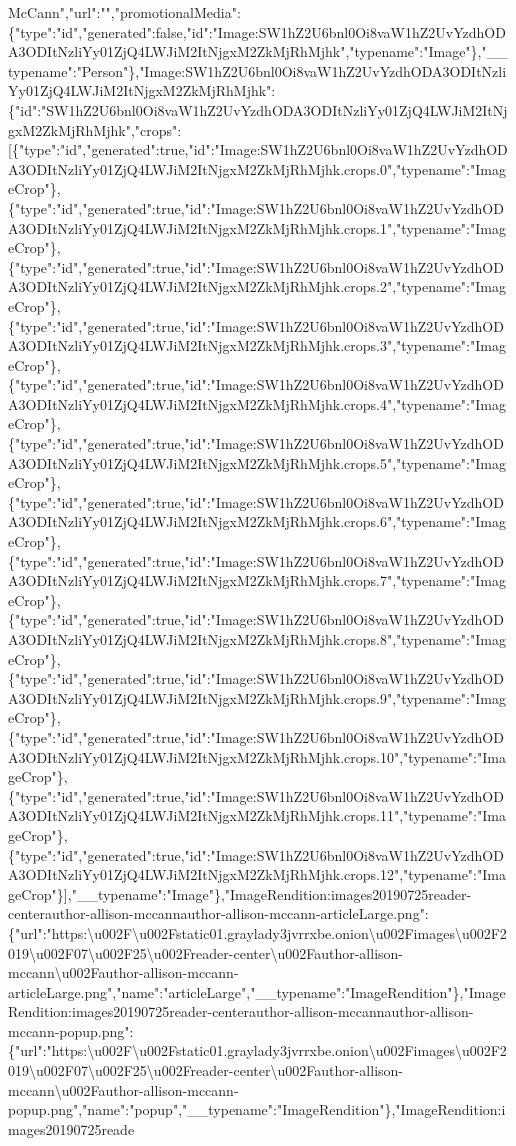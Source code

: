 McCann","url":"","promotionalMedia":\{"type":"id","generated":false,"id":"Image:SW1hZ2U6bnl0Oi8vaW1hZ2UvYzdhODA3ODItNzliYy01ZjQ4LWJiM2ItNjgxM2ZkMjRhMjhk","typename":"Image"\},"\_\_typename":"Person"\},"Image:SW1hZ2U6bnl0Oi8vaW1hZ2UvYzdhODA3ODItNzliYy01ZjQ4LWJiM2ItNjgxM2ZkMjRhMjhk":\{"id":"SW1hZ2U6bnl0Oi8vaW1hZ2UvYzdhODA3ODItNzliYy01ZjQ4LWJiM2ItNjgxM2ZkMjRhMjhk","crops":{[}\{"type":"id","generated":true,"id":"Image:SW1hZ2U6bnl0Oi8vaW1hZ2UvYzdhODA3ODItNzliYy01ZjQ4LWJiM2ItNjgxM2ZkMjRhMjhk.crops.0","typename":"ImageCrop"\},\{"type":"id","generated":true,"id":"Image:SW1hZ2U6bnl0Oi8vaW1hZ2UvYzdhODA3ODItNzliYy01ZjQ4LWJiM2ItNjgxM2ZkMjRhMjhk.crops.1","typename":"ImageCrop"\},\{"type":"id","generated":true,"id":"Image:SW1hZ2U6bnl0Oi8vaW1hZ2UvYzdhODA3ODItNzliYy01ZjQ4LWJiM2ItNjgxM2ZkMjRhMjhk.crops.2","typename":"ImageCrop"\},\{"type":"id","generated":true,"id":"Image:SW1hZ2U6bnl0Oi8vaW1hZ2UvYzdhODA3ODItNzliYy01ZjQ4LWJiM2ItNjgxM2ZkMjRhMjhk.crops.3","typename":"ImageCrop"\},\{"type":"id","generated":true,"id":"Image:SW1hZ2U6bnl0Oi8vaW1hZ2UvYzdhODA3ODItNzliYy01ZjQ4LWJiM2ItNjgxM2ZkMjRhMjhk.crops.4","typename":"ImageCrop"\},\{"type":"id","generated":true,"id":"Image:SW1hZ2U6bnl0Oi8vaW1hZ2UvYzdhODA3ODItNzliYy01ZjQ4LWJiM2ItNjgxM2ZkMjRhMjhk.crops.5","typename":"ImageCrop"\},\{"type":"id","generated":true,"id":"Image:SW1hZ2U6bnl0Oi8vaW1hZ2UvYzdhODA3ODItNzliYy01ZjQ4LWJiM2ItNjgxM2ZkMjRhMjhk.crops.6","typename":"ImageCrop"\},\{"type":"id","generated":true,"id":"Image:SW1hZ2U6bnl0Oi8vaW1hZ2UvYzdhODA3ODItNzliYy01ZjQ4LWJiM2ItNjgxM2ZkMjRhMjhk.crops.7","typename":"ImageCrop"\},\{"type":"id","generated":true,"id":"Image:SW1hZ2U6bnl0Oi8vaW1hZ2UvYzdhODA3ODItNzliYy01ZjQ4LWJiM2ItNjgxM2ZkMjRhMjhk.crops.8","typename":"ImageCrop"\},\{"type":"id","generated":true,"id":"Image:SW1hZ2U6bnl0Oi8vaW1hZ2UvYzdhODA3ODItNzliYy01ZjQ4LWJiM2ItNjgxM2ZkMjRhMjhk.crops.9","typename":"ImageCrop"\},\{"type":"id","generated":true,"id":"Image:SW1hZ2U6bnl0Oi8vaW1hZ2UvYzdhODA3ODItNzliYy01ZjQ4LWJiM2ItNjgxM2ZkMjRhMjhk.crops.10","typename":"ImageCrop"\},\{"type":"id","generated":true,"id":"Image:SW1hZ2U6bnl0Oi8vaW1hZ2UvYzdhODA3ODItNzliYy01ZjQ4LWJiM2ItNjgxM2ZkMjRhMjhk.crops.11","typename":"ImageCrop"\},\{"type":"id","generated":true,"id":"Image:SW1hZ2U6bnl0Oi8vaW1hZ2UvYzdhODA3ODItNzliYy01ZjQ4LWJiM2ItNjgxM2ZkMjRhMjhk.crops.12","typename":"ImageCrop"\}{]},"\_\_typename":"Image"\},"ImageRendition:images20190725reader-centerauthor-allison-mccannauthor-allison-mccann-articleLarge.png":\{"url":"https:\textbackslash{}u002F\textbackslash{}u002Fstatic01.graylady3jvrrxbe.onion\textbackslash{}u002Fimages\textbackslash{}u002F2019\textbackslash{}u002F07\textbackslash{}u002F25\textbackslash{}u002Freader-center\textbackslash{}u002Fauthor-allison-mccann\textbackslash{}u002Fauthor-allison-mccann-articleLarge.png","name":"articleLarge","\_\_typename":"ImageRendition"\},"ImageRendition:images20190725reader-centerauthor-allison-mccannauthor-allison-mccann-popup.png":\{"url":"https:\textbackslash{}u002F\textbackslash{}u002Fstatic01.graylady3jvrrxbe.onion\textbackslash{}u002Fimages\textbackslash{}u002F2019\textbackslash{}u002F07\textbackslash{}u002F25\textbackslash{}u002Freader-center\textbackslash{}u002Fauthor-allison-mccann\textbackslash{}u002Fauthor-allison-mccann-popup.png","name":"popup","\_\_typename":"ImageRendition"\},"ImageRendition:images20190725reade